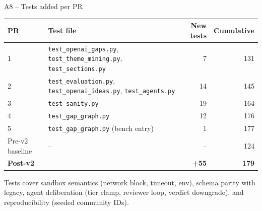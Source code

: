 \documentclass[10pt,aspectratio=169]{beamer}
\begin{document}
\begin{frame}{A8 -- Tests added per PR}
  \begin{table}\centering\scriptsize
    \begin{tabular}{@{}l l r r@{}}
      \toprule
      PR & Test file & New tests & Cumulative \\
      \midrule
      1 & \texttt{test\_openai\_gaps.py}, \texttt{test\_theme\_mining.py}, \texttt{test\_sections.py} & 7  & 131 \\
      2 & \texttt{test\_evaluation.py}, \texttt{test\_openai\_ideas.py}, \texttt{test\_agents.py}    & 14 & 145 \\
      3 & \texttt{test\_sanity.py}                                                                     & 19 & 164 \\
      4 & \texttt{test\_gap\_graph.py}                                                                 & 12 & 176 \\
      5 & \texttt{test\_gap\_graph.py} (bench entry)                                                   & 1  & 177 \\
      \midrule
      Pre-v2 baseline & -- & -- & 124 \\
      \textbf{Post-v2} & & \textbf{+55} & \textbf{179} \\
      \bottomrule
    \end{tabular}
  \end{table}

  \vspace{0.5em}
  \footnotesize Tests cover sandbox semantics (network block, timeout, env), schema
  parity with legacy, agent deliberation (tier clamp, reviewer loop,
  verdict downgrade), and reproducibility (seeded community IDs).
\end{frame}
\end{document}
